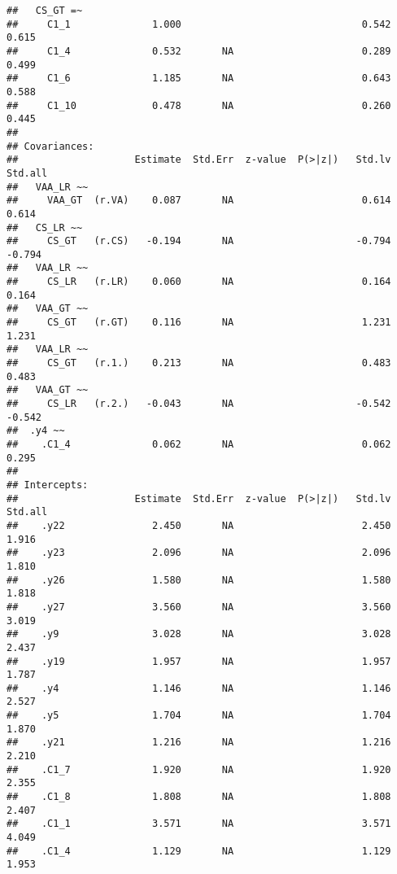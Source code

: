 \documentclass[
]{article}
\begin{document}
\begin{verbatim}
##   CS_GT =~                                                              
##     C1_1              1.000                               0.542    0.615
##     C1_4              0.532       NA                      0.289    0.499
##     C1_6              1.185       NA                      0.643    0.588
##     C1_10             0.478       NA                      0.260    0.445
## 
## Covariances:
##                    Estimate  Std.Err  z-value  P(>|z|)   Std.lv  Std.all
##   VAA_LR ~~                                                             
##     VAA_GT  (r.VA)    0.087       NA                      0.614    0.614
##   CS_LR ~~                                                              
##     CS_GT   (r.CS)   -0.194       NA                     -0.794   -0.794
##   VAA_LR ~~                                                             
##     CS_LR   (r.LR)    0.060       NA                      0.164    0.164
##   VAA_GT ~~                                                             
##     CS_GT   (r.GT)    0.116       NA                      1.231    1.231
##   VAA_LR ~~                                                             
##     CS_GT   (r.1.)    0.213       NA                      0.483    0.483
##   VAA_GT ~~                                                             
##     CS_LR   (r.2.)   -0.043       NA                     -0.542   -0.542
##  .y4 ~~                                                                 
##    .C1_4              0.062       NA                      0.062    0.295
## 
## Intercepts:
##                    Estimate  Std.Err  z-value  P(>|z|)   Std.lv  Std.all
##    .y22               2.450       NA                      2.450    1.916
##    .y23               2.096       NA                      2.096    1.810
##    .y26               1.580       NA                      1.580    1.818
##    .y27               3.560       NA                      3.560    3.019
##    .y9                3.028       NA                      3.028    2.437
##    .y19               1.957       NA                      1.957    1.787
##    .y4                1.146       NA                      1.146    2.527
##    .y5                1.704       NA                      1.704    1.870
##    .y21               1.216       NA                      1.216    2.210
##    .C1_7              1.920       NA                      1.920    2.355
##    .C1_8              1.808       NA                      1.808    2.407
##    .C1_1              3.571       NA                      3.571    4.049
##    .C1_4              1.129       NA                      1.129    1.953

\end{verbatim}
\end{document}
